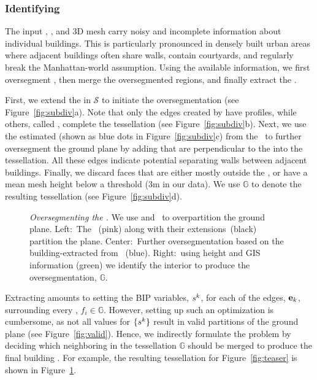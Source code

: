 \subsubsection{Identifying \footprintpolygons} The input \GISds, \streetI, and 3D mesh carry noisy and incomplete information about individual buildings. This is particularly pronounced in densely built urban areas where adjacent buildings often share walls, contain courtyards, and regularly break the Manhattan-world assumption. Using the available information, we first oversegment , then merge the oversegmented regions, and finally extract the \footprintpolygons. %




First, we extend the \sweepedges in $\mathcal{S}$ to initiate the \groundplane oversegmentation (see Figure~\ref{fig:subdiv}a).
%
Note that only the edges created by \sweepedges have profiles, while others, called {\em \softedges}, complete the tessellation (see Figure~\ref{fig:subdiv}b).
%
Next, we use the estimated \buildingfacadepoints (shown as blue dots in Figure~\ref{fig:subdiv}c) from the \streetI\ to further oversegment the ground plane by adding \softedges that are perpendicular to the \buildingfacade 
into the tessellation. All these edges indicate potential separating walls between adjacent buildings.
%
Finally, we discard faces that are either mostly outside the \GISds, or have a mean mesh height below a threshold (3m in our data). 
We use $\mathbb{G}$ to denote the resulting tessellation (see Figure~\ref{fig:subdiv}d).



 \begin{figure}[t!]
    \centering
    \def\svgwidth{\columnwidth}  
    
    \caption{{\it Oversegmenting the \groundplane.}  We use \sweepedges and \GISds\ to overpartition the ground plane. 
    Left:~The \sweepedges~(pink) along with their \softedge extensions~(black) partition the plane. Center:~Further oversegmentation based on the building-\facades extracted from \streetI\ (blue). Right:~using height and GIS information (green) we identify the interior \faces to produce the oversegmentation, $\mathbb{G}$.} 
    \label{fig:partition}
\end{figure}

% 
Extracting \footprintpolygons amounts to setting the BIP variables, $s^k$, for each of the edges, $\mathbf{e}_k$, surrounding every \face, $f_i \in \mathbb{G}$.
%
However, setting up such an optimization is cumbersome, as not all values for $\{s^k\}$ result in valid partitions of the ground plane (see Figure~\ref{fig:valid}). Hence, we indirectly formulate the problem by deciding which neighboring \faces in the tessellation $\mathbb{G}$ should be merged to produce the final building \footprintpolygons.
%
For example, the resulting tessellation for Figure~\ref{fig:teaser} is shown in Figure~\ref{fig:partition}. 



